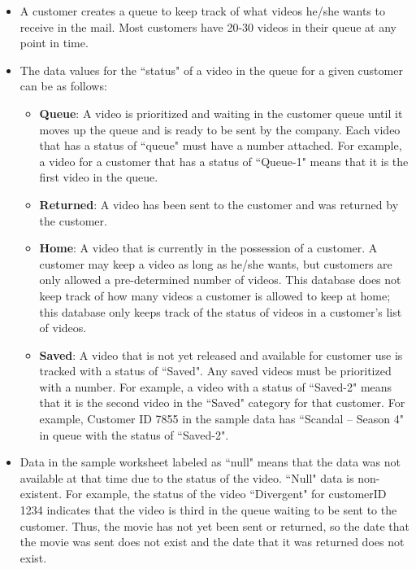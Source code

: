 \documentclass{article}
\begin{document}
\begin{itemize}
  \item A customer creates a queue to keep track of what videos he/she wants to receive in the mail. Most customers have 20-30 videos in their queue at any point in time.

  \item The data values for the ``status" of a video in the queue for a given customer can be as follows:
    \begin{itemize}
      \item \textbf{Queue}: A video is prioritized and waiting in the customer queue until it moves up the queue and is ready to be sent by the company. Each video that has a status of ``queue" must have a number attached. For example, a video for a customer that has a status of ``Queue-1" means that it is the first video in the queue.

      \item \textbf{Returned}: A video has been sent to the customer and was returned by the customer.

      \item \textbf{Home}: A video that is currently in the possession of a customer. A customer may keep a video as long as he/she wants, but customers are only allowed a pre-determined number of videos. This database does not keep track of how many videos a customer is allowed to keep at home; this database only keeps track of the status of videos in a customer’s list of videos.

      \item \textbf{Saved}: A video that is not yet released and available for customer use is tracked with a status of ``Saved". Any saved videos must be prioritized with a number. For example, a video with a status of ``Saved-2" means that it is the second video in the ``Saved" category for that customer. For example, Customer ID 7855 in the sample data has ``Scandal – Season 4" in queue with the status of ``Saved-2".
  \end{itemize}

  \item Data in the sample worksheet labeled as ``null" means that the data was not available at that time due to the status of the video. ``Null" data is non-existent. For example, the status of the video ``Divergent" for customerID 1234 indicates that the video is third in the queue waiting to be sent to the customer. Thus, the movie has not yet been sent or returned, so the date that the movie was sent does not exist and the date that it was returned does not exist.


\end{itemize}
\end{document}
